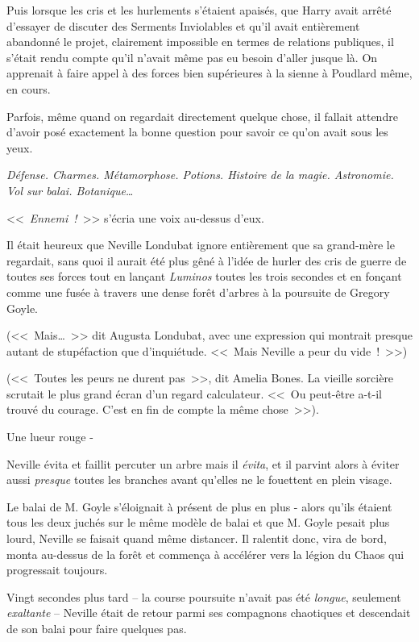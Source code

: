 Puis lorsque les cris et les hurlements s'étaient apaisés, que Harry avait arrêté d'essayer de discuter des Serments Inviolables et qu'il avait entièrement abandonné le projet, clairement impossible en termes de relations publiques, il s'était rendu compte qu'il n'avait même pas eu besoin d'aller jusque là. On apprenait à faire appel à des forces bien supérieures à la sienne à Poudlard même, en cours.

Parfois, même quand on regardait directement quelque chose, il fallait attendre d'avoir posé exactement la bonne question pour savoir ce qu'on avait sous les yeux.

\emph{Défense. Charmes. Métamorphose. Potions. Histoire de la magie. Astronomie. Vol sur balai. Botanique…}

<<~\emph{Ennemi~!}~>> s'écria une voix au-dessus d'eux.

\later

Il était heureux que Neville Londubat ignore entièrement que sa grand-mère le regardait, sans quoi il aurait été plus gêné à l'idée de hurler des cris de guerre de toutes ses forces tout en lançant \emph{Luminos} toutes les trois secondes et en fonçant comme une fusée à travers une dense forêt d'arbres à la poursuite de Gregory Goyle.

(<<~Mais…~>> dit Augusta Londubat, avec une expression qui montrait presque autant de stupéfaction que d'inquiétude. <<~Mais Neville a peur du vide~!~>>)

(<<~Toutes les peurs ne durent pas~>>, dit Amelia Bones. La vieille sorcière scrutait le plus grand écran d'un regard calculateur. <<~Ou peut-être a-t-il trouvé du courage. C'est en fin de compte la même chose~>>).

Une lueur rouge -

Neville évita et faillit percuter un arbre mais il \emph{évita}, et il parvint alors à éviter aussi \emph{presque} toutes les branches avant qu'elles ne le fouettent en plein visage.

Le balai de M. Goyle s'éloignait à présent de plus en plus - alors qu'ils étaient tous les deux juchés sur le même modèle de balai et que M. Goyle pesait plus lourd, Neville se faisait quand même distancer. Il ralentit donc, vira de bord, monta au-dessus de la forêt et commença à accélérer vers la légion du Chaos qui progressait toujours.

Vingt secondes plus tard -- la course poursuite n'avait pas été \emph{longue}, seulement \emph{exaltante} -- Neville était de retour parmi ses compagnons chaotiques et descendait de son balai pour faire quelques pas.

